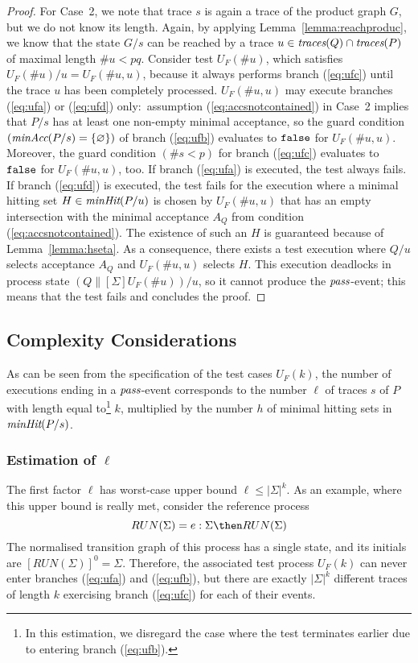\begin{proof}
For   Case~2, we note that trace $s$ is again a trace of the product graph
$G$, but we do not know its length. Again, by applying Lemma~\ref{lemma:reachproduc},
we know that the state   $G/s$ can   be reached by a trace
$u\in\text{\it traces}(Q)\cap\text{\it traces}(P)$ of maximal length $\#u < pq$. Consider test $U_F(\#
u)$, which satisfies $U_F(\# u)/u = U_F(\#u,u)$, because it always performs
branch (\ref{eq:ufc}) until the trace $u$ has been completely processed.
$U_F(\#u,u)$ may execute branches (\ref{eq:ufa}) or (\ref{eq:ufd})
only:~assumption (\ref{eq:accsnotcontained}) in Case~2 implies that $P/s$ has
at least one non-empty minimal acceptance, so the guard condition
$(\text{\it minAcc}(P/s) = \{ \varnothing \})$
of branch (\ref{eq:ufb}) evaluates to $\mbox{{\tt false}}$ for $U_F(\#u,u)$.
Moreover, the guard condition $(\#s < p)$ for branch (\ref{eq:ufc}) evaluates
to $\mbox{{\tt false}}$ for $U_F(\#u,u)$, too. If branch (\ref{eq:ufa}) is executed, the
test always fails. If branch (\ref{eq:ufd}) is executed, the test fails for
the execution where a minimal hitting set $H\in\text{\it minHit}(P/u)$ is chosen
by $U_F(\#u,u)$ that has an empty intersection with the minimal acceptance
$A_Q$ from condition (\ref{eq:accsnotcontained}). The existence of such an
$H$ is guaranteed because of Lemma~\ref{lemma:hseta}. As a consequence, there
exists a test execution   where $Q/u$ selects acceptance $A_Q$ and
$U_F(\#u,u)$ selects $H$. This execution deadlocks in process state
$(Q\parallel[\Sigma]U_F(\# u))/u$, so it cannot produce the ${\text{\it pass}}$-event;
this  means that the test fails and concludes the proof. \xbox
\end{proof}

\subsection{Complexity Considerations}
\label{sec:complexity}

As can be seen from the specification of the test cases $U_F(k)$, the number of
executions ending in a ${\text{\it pass}}$-event corresponds to the number $\ell$ of traces $s$
of $P$ with length equal to\footnote{In this estimation, we disregard
the case where the test
terminates earlier due to entering branch (\ref{eq:ufb}).} $k$,
multiplied by the number $h$ of minimal hitting sets in
$\text{\it minHit}(P/s)$. 



\subsubsection*{Estimation of $\ell$}
The first factor $\ell$
has worst-case upper bound $\ell\le |\Sigma|^k$. As an example, where this upper bound 
is really met, consider the reference process
\[
RUN(\Sigma) = e:\Sigma \then RUN(\Sigma)
\]
The normalised transition graph of this process has a single state, and its initials
are $[RUN(\Sigma)]^0 = \Sigma$. Therefore, the associated test process $U_F(k)$ can 
never enter branches (\ref{eq:ufa}) and (\ref{eq:ufb}), but there are exactly 
$|\Sigma|^k$ different traces of length $k$ exercising branch (\ref{eq:ufc})
for each of their events.

